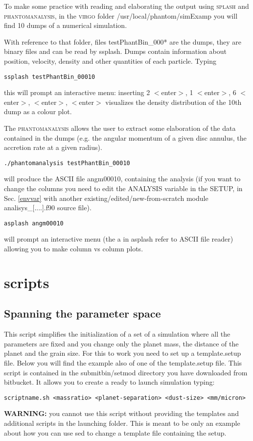 \documentclass[10pt,a4paper,twoside]{article} %
\begin{document}
To make some practice with reading and elaborating the output using \textsc{splash} and \textsc{phantomanalysis}, in the \textsc{virgo} folder /usr/local/phantom/simExamp you will find 10 dumps of a numerical simulation.

With reference to that folder, files testPhantBin\_000* are the dumps, they are binary files and can be read by ssplash. Dumps contain information about position, velocity, density and other quantities of each particle.
Typing
\begin{verbatim}
ssplash testPhantBin_00010
\end{verbatim}
this will prompt an interactive menu: inserting 2 $<$enter$>$, 1 $<$enter$>$, 6 $<$enter$>$, $<$enter$>$, $<$enter$>$ visualizes the density distribution of the 10th dump as a colour plot.

The \textsc{phantomanalysis} allows the user to extract some elaboration of the data contained in the dumps (e.g. the angular momentum of a given disc annulus, the accretion rate at a given radius). 
\begin{verbatim}
./phantomanalysis testPhantBin_00010
\end{verbatim}
will produce the ASCII file angm00010, containing the analysis (if you want to change the columns you need to edit the ANALYSIS variable in the SETUP, in Sec. \ref{envvar} with another existing/edited/new-from-scratch module analisys\_[....].f90 source file).
\begin{verbatim}
asplash angm00010
\end{verbatim}
will prompt an interactive menu (the a in asplash refer to ASCII file reader) allowing you to make column vs column plots.

\section{scripts}

\subsection{Spanning the parameter space}\label{pspacespan}

This script simplifies the initialization of a set of a simulation where all the parameters are fixed and you change only the planet mass, the distance of the planet and the grain size. For this to work you need to set up a template.setup file. Below you will find the example also of one of the template.setup file. This script is contained in the submitbin/setmod directory you have downloaded from bitbucket.
It allows you to create a ready to launch simulation typing:
\begin{verbatim}
scriptname.sh <massratio> <planet-separation> <dust-size> <mm/micron>
\end{verbatim}
\textbf{WARNING:} you cannot use this script without providing the templates and additional scripts in the launching folder. This is meant to be only an example about how you can use sed to change a template file containing the setup.
\end{document}
